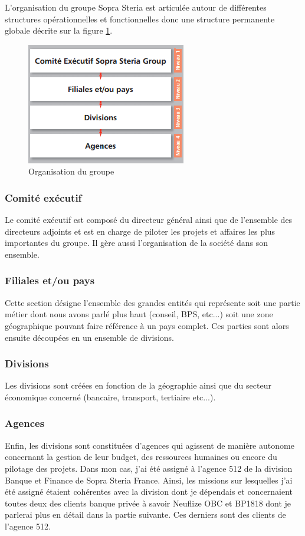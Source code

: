 	L'organisation du groupe Sopra Steria est articulée autour de différentes structures opérationnelles et fonctionnelles donc une structure permanente globale décrite sur la figure \ref{sopraSteriaOrganisation}.

\begin{figure}[h]
	\includegraphics[scale=0.8]{images/entreprise/sopraSteriaOrganisation.png}
	\centering
	\caption{Organisation du groupe}
	\label{sopraSteriaOrganisation}
\end{figure}
		
\subsubsection{Comité exécutif}

	Le comité exécutif est composé du directeur général ainsi que de l'ensemble des directeurs adjoints et est en charge de piloter les projets et affaires les plus importantes du groupe. Il gère aussi l'organisation de la société dans son ensemble.

\subsubsection{Filiales et/ou pays}

	Cette section désigne l'ensemble des grandes entités qui représente soit une partie métier dont nous avons parlé plus haut (conseil, BPS, etc...) soit une zone géographique pouvant faire référence à un pays complet. Ces parties sont alors ensuite découpées en un ensemble de divisions.

\subsubsection{Divisions}

	Les divisions sont créées en fonction de la géographie ainsi que du secteur économique concerné (bancaire, transport, tertiaire etc...).

\subsubsection{Agences}

	Enfin, les divisions sont constituées d'agences qui agissent de manière autonome concernant la gestion de leur budget, des ressources humaines ou encore du pilotage des projets. Dans mon cas, j'ai été assigné à l'agence 512 de la division Banque et Finance de Sopra Steria France. Ainsi, les missions sur lesquelles j'ai été assigné étaient cohérentes avec la division dont je dépendais et concernaient toutes deux des clients banque privée à savoir Neuflize OBC et BP1818 dont je parlerai plus en détail dans la partie suivante. Ces derniers sont des clients de l'agence 512. 